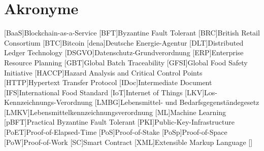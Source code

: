 \section*{Akronyme}            %
\begin{acronym}[HACCP]
	[BaaS]{Blockchain-as-a-Service}
  [BFT]{Byzantine Fault Tolerant}
  [BRC]{British Retail Consortium}
	[BTC]{Bitcoin}
	[dena]{Deutsche Energie-Agentur}
	[DLT]{Distributed Ledger Technology}
  [DSGVO]{Datenschutz-Grundverordnung}
  [ERP]{Enterprise Resource Planning}
  [GBT]{Global Batch Traceability}
  [GFSI]{Global Food Safety Initiative}
  [HACCP]{Hazard Analysis and Critical Control Points}
  [HTTP]{Hypertext Transfer Protocol}
  [IDoc]{Intermediate Document}
  [IFS]{International Food Standard}
	[IoT]{Internet of Things}
  [LKV]{Los-Kennzeichnungs-Verordnung}
  [LMBG]{Lebensmittel- und Bedarfsgegenständegesetz}
  [LMKV]{Lebensmittelkennzeichnungsverordnung}
	[ML]{Machine Learning}
  [pBFT]{Practical Byzantine Fault Tolerant}
  [PKI]{Public-Key-Infrastructure}
  [PoET]{Proof-of-Elapsed-Time}
  [PoS]{Proof-of-Stake}
  [PoSp]{Proof-of-Space}
	[PoW]{Proof-of-Work}
	[SC]{Smart Contract}
  [XML]{Extensible Markup Language}
  \acro{}[]{}
\end{acronym}

\newpage

\listoffigures
{}
\listoftables
{}
\newpage
